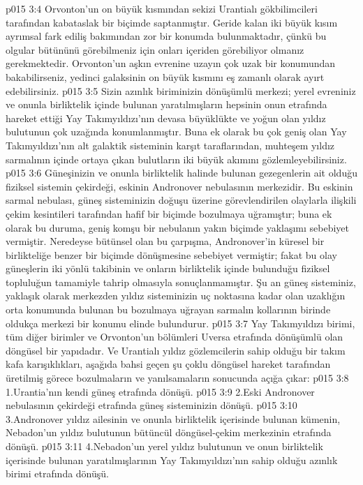 \vs p015 3:4 Orvonton’un on büyük kısmından sekizi Urantialı gökbilimcileri tarafından kabataslak bir biçimde saptanmıştır. Geride kalan iki büyük kısım ayrımsal fark ediliş bakımından zor bir konumda bulunmaktadır, çünkü bu olgular bütününü görebilmeniz için onları içeriden görebiliyor olmanız gerekmektedir. Orvonton’un aşkın evrenine uzayın çok uzak bir konumundan bakabilirseniz, yedinci galaksinin on büyük kısmını eş zamanlı olarak ayırt edebilirsiniz.
\vs p015 3:5 Sizin azınlık biriminizin dönüşümlü merkezi; yerel evreniniz ve onunla birliktelik içinde bulunan yaratılmışların hepsinin onun etrafında hareket ettiği Yay Takımyıldızı’nın devasa büyüklükte ve yoğun olan yıldız bulutunun çok uzağında konumlanmıştır. Buna ek olarak bu çok geniş olan Yay Takımyıldızı’nın alt galaktik sisteminin karşıt taraflarından, muhteşem yıldız sarmalının içinde ortaya çıkan bulutların iki büyük akımını gözlemleyebilirsiniz.
\vs p015 3:6 Güneşinizin ve onunla birliktelik halinde bulunan gezegenlerin ait olduğu fiziksel sistemin çekirdeği, eskinin Andronover nebulasının merkezidir. Bu eskinin sarmal nebulası, güneş sisteminizin doğuşu üzerine görevlendirilen olaylarla ilişkili çekim kesintileri tarafından hafif bir biçimde bozulmaya uğramıştır; buna ek olarak bu duruma, geniş komşu bir nebulanın yakın biçimde yaklaşımı sebebiyet vermiştir. Neredeyse bütünsel olan bu çarpışma, Andronover’in küresel bir birlikteliğe benzer bir biçimde dönüşmesine sebebiyet vermiştir; fakat bu olay güneşlerin iki yönlü takibinin ve onların birliktelik içinde bulunduğu fiziksel topluluğun tamamiyle tahrip olmasıyla sonuçlanmamıştır. Şu an güneş sisteminiz, yaklaşık olarak merkezden yıldız sisteminizin uç noktasına kadar olan uzaklığın orta konumunda bulunan bu bozulmaya uğrayan sarmalın kollarının birinde oldukça merkezi bir konumu elinde bulundurur.
\vs p015 3:7 Yay Takımyıldızı birimi, tüm diğer birimler ve Orvonton’un bölümleri Uversa etrafında dönüşümlü olan döngüsel bir yapıdadır. Ve Urantialı yıldız gözlemcilerin sahip olduğu bir takım kafa karışıklıkları, aşağıda bahsi geçen şu çoklu döngüsel hareket tarafından üretilmiş görece bozulmaların ve yanılsamaların sonucunda açığa çıkar:
\vs p015 3:8 1.\bibnobreakspace Urantia’nın kendi güneş etrafında dönüşü.
\vs p015 3:9 2.\bibnobreakspace Eski Andronover nebulasının çekirdeği etrafında güneş sisteminizin dönüşü.
\vs p015 3:10 3.\bibnobreakspace Andronover yıldız ailesinin ve onunla birliktelik içerisinde bulunan kümenin, Nebadon’un yıldız bulutunun bütüncül döngüsel\hyp{}çekim merkezinin etrafında dönüşü.
\vs p015 3:11 4.\bibnobreakspace Nebadon’un yerel yıldız bulutunun ve onun birliktelik içerisinde bulunan yaratılmışlarının Yay Takımyıldızı’nın sahip olduğu azınlık birimi etrafında dönüşü.
